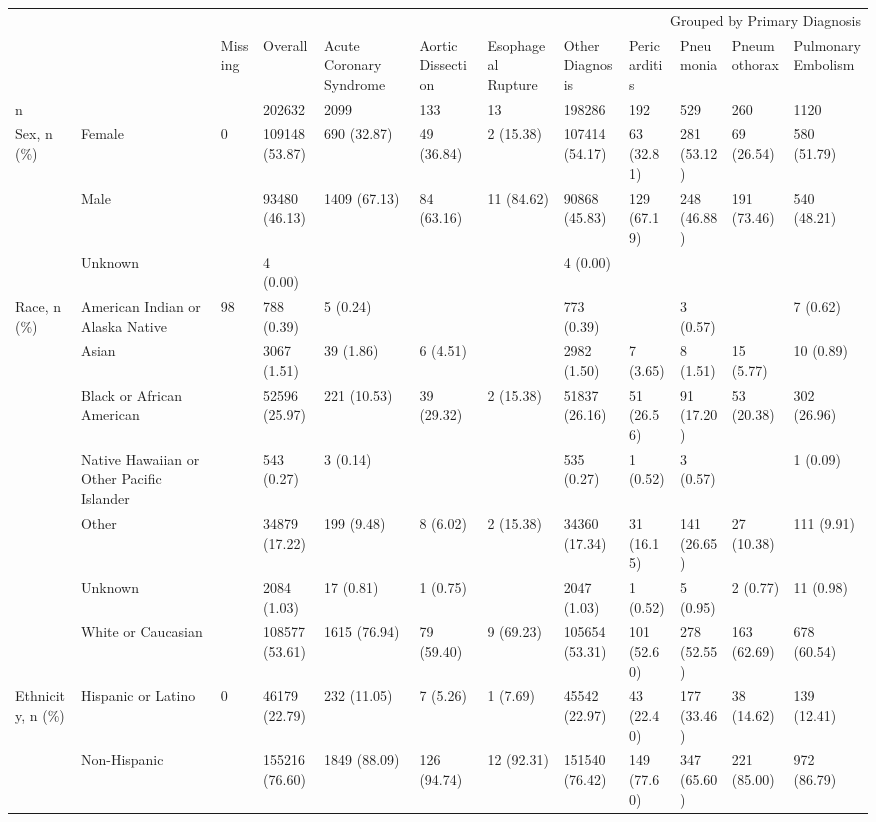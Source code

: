 \begin{tabular}{llllllllllll}
\toprule
 &  & \multicolumn{10}{r}{Grouped by Primary Diagnosis} \\
 &  & Missing & Overall & Acute Coronary Syndrome & Aortic Dissection & Esophageal Rupture & Other Diagnosis & Pericarditis & Pneumonia & Pneumothorax & Pulmonary Embolism \\
\midrule
n &  &  & 202632 & 2099 & 133 & 13 & 198286 & 192 & 529 & 260 & 1120 \\
\cline{1-12}
\multirow[t]{3}{*}{Sex, n (\%)} & Female & 0 & 109148 (53.87) & 690 (32.87) & 49 (36.84) & 2 (15.38) & 107414 (54.17) & 63 (32.81) & 281 (53.12) & 69 (26.54) & 580 (51.79) \\
 & Male &  & 93480 (46.13) & 1409 (67.13) & 84 (63.16) & 11 (84.62) & 90868 (45.83) & 129 (67.19) & 248 (46.88) & 191 (73.46) & 540 (48.21) \\
 & Unknown &  & 4 (0.00) &  &  &  & 4 (0.00) &  &  &  &  \\
\cline{1-12}
\multirow[t]{7}{*}{Race, n (\%)} & American Indian or Alaska Native & 98 & 788 (0.39) & 5 (0.24) &  &  & 773 (0.39) &  & 3 (0.57) &  & 7 (0.62) \\
 & Asian &  & 3067 (1.51) & 39 (1.86) & 6 (4.51) &  & 2982 (1.50) & 7 (3.65) & 8 (1.51) & 15 (5.77) & 10 (0.89) \\
 & Black or African American &  & 52596 (25.97) & 221 (10.53) & 39 (29.32) & 2 (15.38) & 51837 (26.16) & 51 (26.56) & 91 (17.20) & 53 (20.38) & 302 (26.96) \\
 & Native Hawaiian or Other Pacific Islander &  & 543 (0.27) & 3 (0.14) &  &  & 535 (0.27) & 1 (0.52) & 3 (0.57) &  & 1 (0.09) \\
 & Other &  & 34879 (17.22) & 199 (9.48) & 8 (6.02) & 2 (15.38) & 34360 (17.34) & 31 (16.15) & 141 (26.65) & 27 (10.38) & 111 (9.91) \\
 & Unknown &  & 2084 (1.03) & 17 (0.81) & 1 (0.75) &  & 2047 (1.03) & 1 (0.52) & 5 (0.95) & 2 (0.77) & 11 (0.98) \\
 & White or Caucasian &  & 108577 (53.61) & 1615 (76.94) & 79 (59.40) & 9 (69.23) & 105654 (53.31) & 101 (52.60) & 278 (52.55) & 163 (62.69) & 678 (60.54) \\
\cline{1-12}
\multirow[t]{3}{*}{Ethnicity, n (\%)} & Hispanic or Latino & 0 & 46179 (22.79) & 232 (11.05) & 7 (5.26) & 1 (7.69) & 45542 (22.97) & 43 (22.40) & 177 (33.46) & 38 (14.62) & 139 (12.41) \\
 & Non-Hispanic &  & 155216 (76.60) & 1849 (88.09) & 126 (94.74) & 12 (92.31) & 151540 (76.42) & 149 (77.60) & 347 (65.60) & 221 (85.00) & 972 (86.79) \\

\end{tabular}
